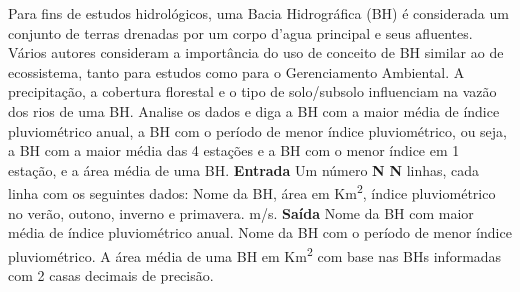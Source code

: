 \documentclass[a4paper, 12pt]{article}
\begin{document}
Para fins de estudos hidrológicos, uma Bacia Hidrográfica (BH) é considerada um conjunto de terras drenadas por um corpo d’agua principal e seus afluentes. Vários autores consideram a importância do uso de conceito de BH similar ao de ecossistema, tanto para estudos como para o Gerenciamento Ambiental. A precipitação, a cobertura florestal e o tipo de solo/subsolo influenciam na vazão dos rios de uma BH. Analise os dados e diga a BH com a maior média de índice pluviométrico anual, a BH com o período de menor índice pluviométrico, ou seja, a BH com a maior média das 4 estações e a BH com o menor índice em 1 estação, e a área média de uma BH.
\newline \newline
\textbf{{\large Entrada}} \newline
Um número \textbf{N} \newline
\textbf{N} linhas, cada linha com os seguintes dados:\newline
Nome da BH, área em Km\textsuperscript{2}, índice pluviométrico no verão, outono, inverno e primavera.
m/s.
\newline \newline
\textbf{{\large Saída}} \newline
Nome da BH com maior média de índice pluviométrico anual.\newline
Nome da BH com o período de menor índice pluviométrico.\newline
A área média de uma BH em Km\textsuperscript{2} com base nas BHs informadas com 2 casas decimais de precisão.
\newline \newline
\newline
\end{document}
